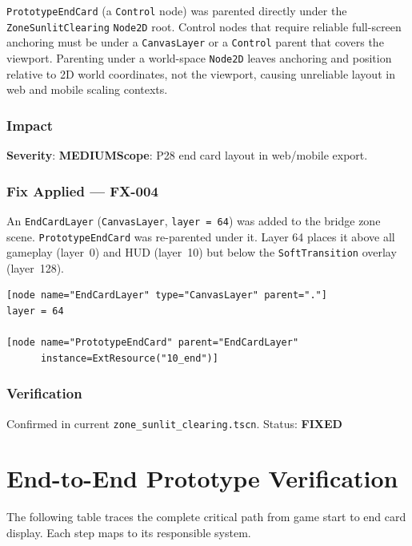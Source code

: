 \documentclass[12pt, a4paper]{article}
\newcommand{\sevMed}{\textcolor{medyell}{\textbf{MEDIUM}}}
\newcommand{\sevFixed}{\textcolor{passgre}{\textbf{FIXED}}}
\begin{document}
\texttt{PrototypeEndCard} (a \texttt{Control} node) was parented directly
under the \texttt{ZoneSunlitClearing} \texttt{Node2D} root. Control nodes
that require reliable full-screen anchoring must be under a
\texttt{CanvasLayer} or a \texttt{Control} parent that covers the viewport.
Parenting under a world-space \texttt{Node2D} leaves anchoring and position
relative to 2D world coordinates, not the viewport, causing unreliable layout
in web and mobile scaling contexts.

\subsubsection*{Impact}

\textbf{Severity}: \sevMed\quad\textbf{Scope}: P28 end card layout in web/mobile export.

\subsubsection*{Fix Applied — FX-004}

An \texttt{EndCardLayer} (\texttt{CanvasLayer}, \texttt{layer = 64}) was
added to the bridge zone scene. \texttt{PrototypeEndCard} was re-parented
under it. Layer 64 places it above all gameplay (layer~0) and HUD (layer~10)
but below the \texttt{SoftTransition} overlay (layer~128).

\begin{lstlisting}
[node name="EndCardLayer" type="CanvasLayer" parent="."]
layer = 64

[node name="PrototypeEndCard" parent="EndCardLayer"
      instance=ExtResource("10_end")]
\end{lstlisting}

\subsubsection*{Verification}

Confirmed in current \texttt{zone\_sunlit\_clearing.tscn}.
Status: \sevFixed

\section{End-to-End Prototype Verification}
\label{sec:e2e}

The following table traces the complete critical path from game start to end
card display. Each step maps to its responsible system.
\end{document}
